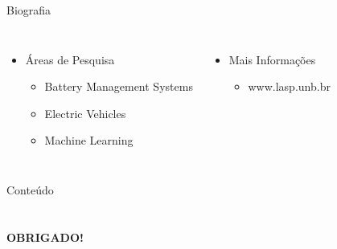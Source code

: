 \begin {frame}[shrink=30]{Biografia}
\begin{columns}[c]
\begin{itemize}
  \item Áreas de Pesquisa
  \begin{itemize}
    \item Battery Management Systems
    \item Electric Vehicles
    \item Machine Learning
  \end{itemize}
\end{itemize}

\begin{itemize}
  \item Mais Informações
  \begin{itemize}
    \item www.lasp.unb.br
  \end{itemize}
\end{itemize}

\end{columns}
\end {frame}



\begin {frame}{Conteúdo}
\small
    \begin{multicols}{2}
        \tableofcontents
    \end{multicols}
\end {frame}















\section*{}
\begin{frame}
\begin{center}
  \Huge\ttfamily \textbf {OBRIGADO!}
\end{center}
\end{frame}



